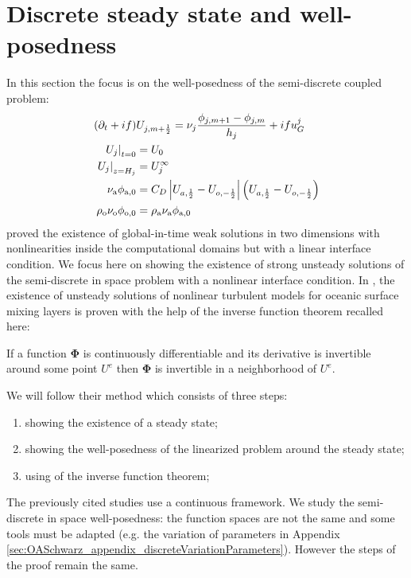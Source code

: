 \section{Discrete steady state and well-posedness}
\label{sec:OASchwarz_DiscreteStationaryState}
In this section the focus is on the well-posedness of
the semi-discrete coupled problem:
\begin{subequations}
\label{eq:OASchwarz_SemiDiscreteCoupledProblem}
\begin{align}
(\partial_t + if) &U_{j, m+\frac{1}{2}} = \nu_j
	\frac{\phi_{j,m+1} - \phi_{j,m}}{h_j} + if u_G^j
\\
	\left.U_j\right|_{t=0} &= U_0\\
	\left.U_j\right|_{z=H_j} &= U_j^\infty\\
	\nu_{\rm a}\phi_{{\rm a}, 0} &=  C_D
\left|
	{U}_{a, \frac{1}{2}}
-
	{U}_{o, -\frac{1}{2}}
\right|
\left(
	{U}_{a, \frac{1}{2}}
-
	{U}_{o, -\frac{1}{2}}
\right)
\\
	\rho_{\rm o} \nu_{\rm o}\phi_{{\rm o}, 0} &= \rho_{\rm a}
	\nu_{\rm a}\phi_{{\rm a}, 0}
\end{align}
\end{subequations}
\cite{lions_mathematical_1995} proved the existence
of global-in-time weak solutions in
two dimensions with nonlinearities inside the
computational domains but with a linear
interface condition.
We focus here on showing the existence of strong
unsteady solutions of the semi-discrete in space
problem with a nonlinear interface condition.
In \citep{chacon-rebollo_existence_2014},
the existence of unsteady solutions of
nonlinear turbulent models for oceanic surface mixing layers is
proven with the help of the inverse function theorem recalled here:
\begin{invFuncTheorem}
	If a function $\mathbf{\Phi}$
	is continuously differentiable and
	its derivative is invertible around some point $U^e$
	then $\mathbf{\Phi}$ is invertible in a neighborhood of $U^e$.
\end{invFuncTheorem}
\par
We will follow their method which consists of three steps:
\begin{enumerate}
	\item showing the existence of a steady state;
	\item showing the well-posedness of the linearized problem
	around the steady state;
	\item using of the inverse function theorem;
\end{enumerate}
The previously cited studies use a continuous framework.
We study the semi-discrete in space well-posedness:
the function spaces are not the same and some tools must be adapted
(e.g. the variation of parameters in Appendix
\ref{sec:OASchwarz_appendix_discreteVariationParameters}).
However the steps of the proof remain the same.
